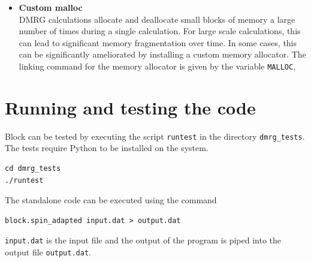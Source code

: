 \documentclass[letterpaper,12pt,aps, pra]{revtex4-1}
\begin{document}
\begin{itemize}
	\item \textbf{Custom malloc}\\
DMRG calculations allocate and deallocate small blocks of memory a large number of times during a single calculation. For large scale calculations,
this can lead to significant memory fragmentation over time. In some cases, this can be significantly ameliorated by installing a
custom memory allocator. The linking command for the memory allocator is given by the variable \texttt{MALLOC},
\end{itemize}


\section{Running and testing the code}
Block can be tested by executing the script \texttt{runtest} in the  directory \texttt{dmrg\_tests}. The tests require Python to be installed on the system.
\begin{verbatim}
cd dmrg_tests
./runtest
\end{verbatim}

The standalone code can be executed using the command
\begin{verbatim}
block.spin_adapted input.dat > output.dat
\end{verbatim}
\texttt{input.dat} is the input file and the output of the program is piped 
into the output file \texttt{output.dat}.




\end{document}
